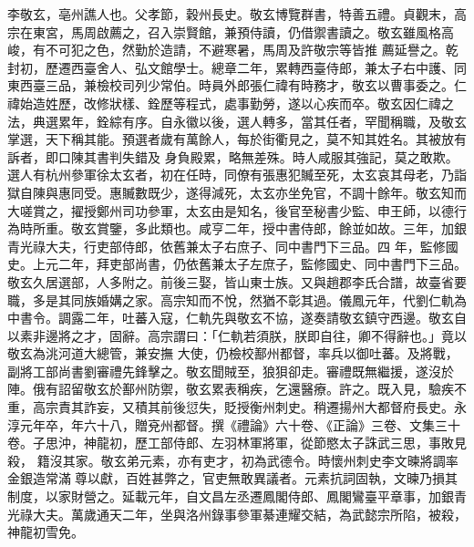 \begin{pinyinscope}
 李敬玄，亳州譙人也。父孝節，穀州長史。敬玄博覽群書，特善五禮。貞觀末，高宗在東宮，馬周啟薦之，召入崇賢館，兼預侍讀，仍借禦書讀之。敬玄雖風格高峻，有不可犯之色，然勤於造請，不避寒暑，馬周及許敬宗等皆推
 薦延譽之。乾封初，歷遷西臺舍人、弘文館學士。總章二年，累轉西臺侍郎，兼太子右中護、同東西臺三品，兼檢校司列少常伯。時員外郎張仁禕有時務才，敬玄以曹事委之。仁禕始造姓歷，改修狀樣、銓歷等程式，處事勤勞，遂以心疾而卒。敬玄因仁禕之法，典選累年，銓綜有序。自永徽以後，選人轉多，當其任者，罕聞稱職，及敬玄掌選，天下稱其能。預選者歲有萬餘人，每於街衢見之，莫不知其姓名。其被放有訴者，即口陳其書判失錯及
 身負殿累，略無差殊。時人咸服其強記，莫之敢欺。選人有杭州參軍徐太玄者，初在任時，同僚有張惠犯贓至死，太玄哀其母老，乃詣獄自陳與惠同受。惠贓數既少，遂得減死，太玄亦坐免官，不調十餘年。敬玄知而大嗟賞之，擢授鄭州司功參軍，太玄由是知名，後官至秘書少監、申王師，以德行為時所重。敬玄賞鑒，多此類也。咸亨二年，授中書侍郎，餘並如故。三年，加銀青光祿大夫，行吏部侍郎，依舊兼太子右庶子、同中書門下三品。四
 年，監修國史。上元二年，拜吏部尚書，仍依舊兼太子左庶子，監修國史、同中書門下三品。敬玄久居選部，人多附之。前後三娶，皆山東士族。又與趙郡李氏合譜，故臺省要職，多是其同族婚媾之家。高宗知而不悅，然猶不彰其過。儀鳳元年，代劉仁軌為中書令。調露二年，吐蕃入寇，仁軌先與敬玄不協，遂奏請敬玄鎮守西邊。敬玄自以素非邊將之才，固辭。高宗謂曰：「仁軌若須朕，朕即自往，卿不得辭也。」竟以敬玄為洮河道大總管，兼安撫
 大使，仍檢校鄯州都督，率兵以御吐蕃。及將戰，副將工部尚書劉審禮先鋒擊之。敬玄聞賊至，狼狽卻走。審禮既無繼援，遂沒於陣。俄有詔留敬玄於鄯州防禦，敬玄累表稱疾，乞還醫療。許之。既入見，驗疾不重，高宗責其詐妄，又積其前後愆失，貶授衡州刺史。稍遷揚州大都督府長史。永淳元年卒，年六十八，贈兗州都督。撰《禮論》六十卷、《正論》三卷、文集三十卷。子思沖，神龍初，歷工部侍郎、左羽林軍將軍，從節愍太子誅武三思，事敗見殺，
 籍沒其家。敬玄弟元素，亦有吏才，初為武德令。時懷州刺史李文暕將調率金銀造常滿尊以獻，百姓甚弊之，官吏無敢異議者。元素抗詞固執，文暕乃損其制度，以家財營之。延載元年，自文昌左丞遷鳳閣侍郎、鳳閣鸞臺平章事，加銀青光祿大夫。萬歲通天二年，坐與洛州錄事參軍綦連耀交結，為武懿宗所陷，被殺，神龍初雪免。




\end{pinyinscope}
